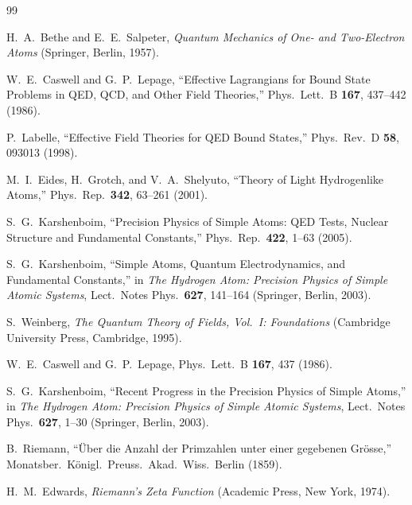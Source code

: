 \documentclass[11pt,a4paper]{article}
\begin{document}
\begin{thebibliography}{99}

H.~A.~Bethe and E.~E.~Salpeter,
\emph{Quantum Mechanics of One- and Two-Electron Atoms}
(Springer, Berlin, 1957).  %

W.~E.~Caswell and G.~P.~Lepage,
``Effective Lagrangians for Bound State Problems in QED, QCD, and Other Field Theories,''
Phys.\ Lett.\ B \textbf{167}, 437–442 (1986).  %

P.~Labelle,
``Effective Field Theories for QED Bound States,''
Phys.\ Rev.\ D \textbf{58}, 093013 (1998).  %

M.~I.~Eides, H.~Grotch, and V.~A.~Shelyuto,
``Theory of Light Hydrogenlike Atoms,''
Phys.\ Rep.\ \textbf{342}, 63–261 (2001).  %

S.~G.~Karshenboim,
``Precision Physics of Simple Atoms: QED Tests, Nuclear Structure and Fundamental Constants,''
Phys.\ Rep.\ \textbf{422}, 1–63 (2005).  %

S.~G.~Karshenboim,
``Simple Atoms, Quantum Electrodynamics, and Fundamental Constants,''
in \emph{The Hydrogen Atom: Precision Physics of Simple Atomic Systems},
Lect.\ Notes Phys.\ \textbf{627}, 141–164 (Springer, Berlin, 2003).  %

S.~Weinberg,
\emph{The Quantum Theory of Fields, Vol.~I: Foundations}
(Cambridge University Press, Cambridge, 1995).  %

W.~E.~Caswell and G.~P.~Lepage,
Phys.\ Lett.\ B \textbf{167}, 437 (1986).  %

S.~G.~Karshenboim,
``Recent Progress in the Precision Physics of Simple Atoms,''
in \emph{The Hydrogen Atom: Precision Physics of Simple Atomic Systems},
Lect.\ Notes Phys.\ \textbf{627}, 1–30 (Springer, Berlin, 2003).  %

B.~Riemann,
``Über die Anzahl der Primzahlen unter einer gegebenen Grösse,''
Monatsber.\ Königl.\ Preuss.\ Akad.\ Wiss.\ Berlin (1859).  %

H.~M.~Edwards,
\emph{Riemann's Zeta Function}
(Academic Press, New York, 1974).  %

\end{thebibliography}
\end{document}
